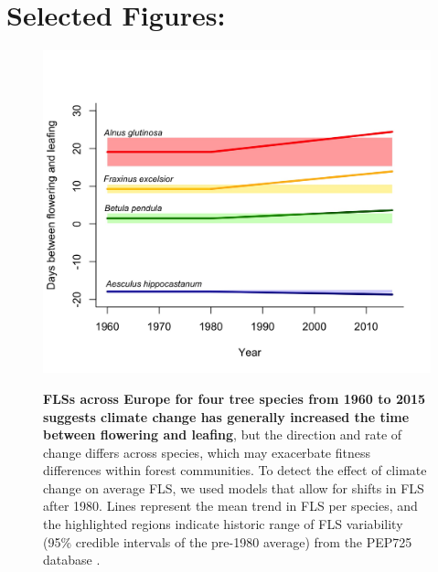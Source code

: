\documentclass[11pt,a4paper]{article}\usepackage[]{graphicx}\usepackage[]{color}
\begin{document}
\section*{Selected Figures:}
   \begin{figure}[ht!]
   \centering
 \includegraphics[width=\textwidth]{..//PEP725/FLS_climate_change.jpeg}\\
\caption{\textbf{FLSs across Europe for four tree species from 1960 to 2015 suggests climate change has generally increased the time between flowering and leafing}, but the direction and rate of change differs across species, which may exacerbate fitness differences within forest communities. To detect the effect of climate change on average FLS, we used models that allow for shifts in FLS after 1980. Lines represent the mean trend in FLS per species, and the highlighted regions indicate historic range of FLS variability (95\% credible intervals of the pre-1980 average) from the PEP725 database \citep{PEP725}.}
    \label{fig:climchange}
    \end{figure}
\newpage

\end{document}
